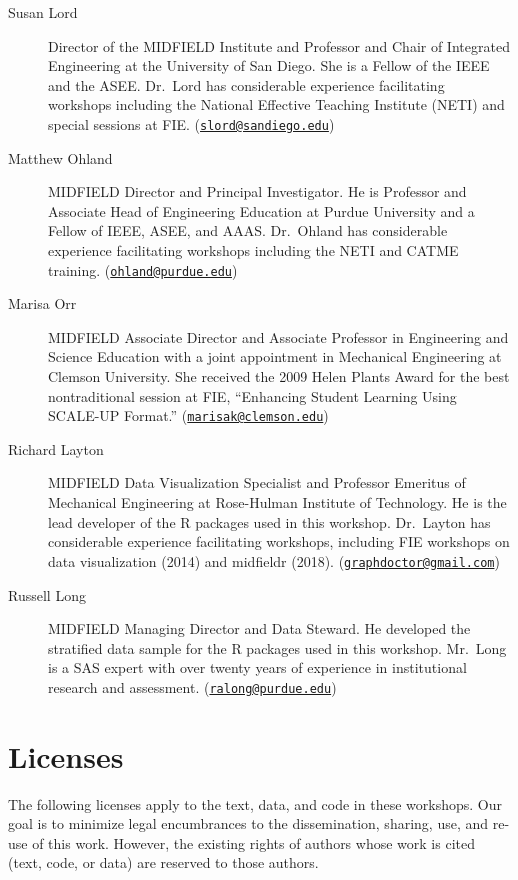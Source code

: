 \documentclass[
]{book}
\begin{document}
\begin{description}
\item[Susan Lord]
Director of the MIDFIELD Institute and Professor and Chair of Integrated Engineering at the University of San Diego. She is a Fellow of the IEEE and the ASEE. Dr.~Lord has considerable experience facilitating workshops including the National Effective Teaching Institute (NETI) and special sessions at FIE. (\href{mailto:slord@sandiego.edu}{\nolinkurl{slord@sandiego.edu}})
\item[Matthew Ohland]
MIDFIELD Director and Principal Investigator. He is Professor and Associate Head of Engineering Education at Purdue University and a Fellow of IEEE, ASEE, and AAAS. Dr.~Ohland has considerable experience facilitating workshops including the NETI and CATME training. (\href{mailto:ohland@purdue.edu}{\nolinkurl{ohland@purdue.edu}})
\item[Marisa Orr]
MIDFIELD Associate Director and Associate Professor in Engineering and Science Education with a joint appointment in Mechanical Engineering at Clemson University. She received the 2009 Helen Plants Award for the best nontraditional session at FIE, ``Enhancing Student Learning Using SCALE-UP Format.'' (\href{mailto:marisak@clemson.edu}{\nolinkurl{marisak@clemson.edu}})
\item[Richard Layton]
MIDFIELD Data Visualization Specialist and Professor Emeritus of Mechanical Engineering at Rose-Hulman Institute of Technology. He is the lead developer of the R packages used in this workshop. Dr.~Layton has considerable experience facilitating workshops, including FIE workshops on data visualization (2014) and midfieldr (2018). (\href{mailto:graphdoctor@gmail.com}{\nolinkurl{graphdoctor@gmail.com}})
\item[Russell Long]
MIDFIELD Managing Director and Data Steward. He developed the stratified data sample for the R packages used in this workshop. Mr.~Long is a SAS expert with over twenty years of experience in institutional research and assessment. (\href{mailto:ralong@purdue.edu}{\nolinkurl{ralong@purdue.edu}})
\end{description}

\hypertarget{licenses}{%
\section*{Licenses}\label{licenses}}

The following licenses apply to the text, data, and code in these workshops. Our goal is to minimize legal encumbrances to the dissemination, sharing, use, and re-use of this work. However, the existing rights of authors whose work is cited (text, code, or data) are reserved to those authors.
\end{document}
